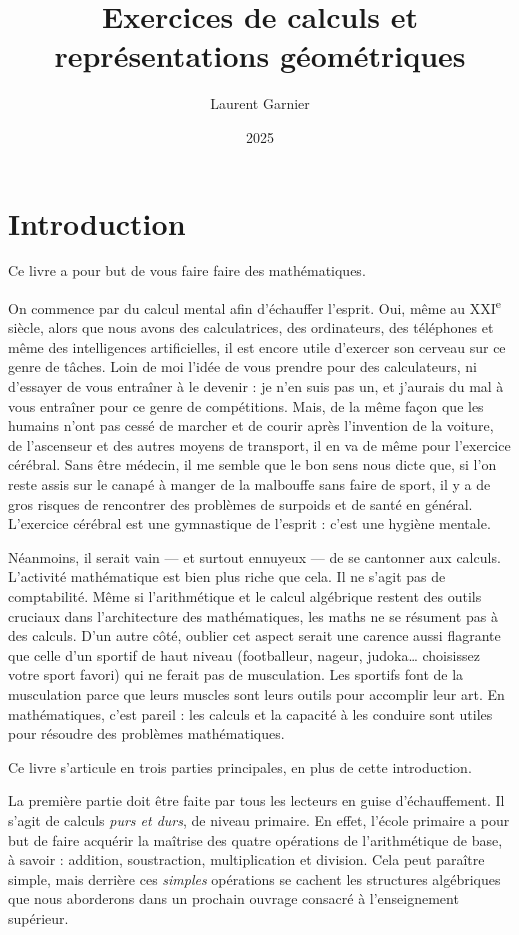 \documentclass[11pt]{article}
\author{Laurent Garnier}
\date{2025}
\title{Exercices de calculs et représentations géométriques}
\begin{document}
\maketitle




\section{Introduction}
\label{sec:org844a7ea}

Ce livre a pour but de vous faire faire des mathématiques. 

On commence par du calcul mental afin d’échauffer l’esprit. Oui, même
au XXI\textsuperscript{e} siècle, alors que nous avons des calculatrices, des
ordinateurs, des téléphones et même des intelligences artificielles,
il est encore utile d’exercer son cerveau sur ce genre de tâches. Loin
de moi l’idée de vous prendre pour des calculateurs, ni d’essayer de
vous entraîner à le devenir : je n’en suis pas un, et j’aurais du mal
à vous entraîner pour ce genre de compétitions. Mais, de la même façon
que les humains n’ont pas cessé de marcher et de courir après
l’invention de la voiture, de l’ascenseur et des autres moyens de
transport, il en va de même pour l’exercice cérébral. Sans être
médecin, il me semble que le bon sens nous dicte que, si l’on reste
assis sur le canapé à manger de la malbouffe sans faire de sport, il y
a de gros risques de rencontrer des problèmes de surpoids et de santé
en général. L’exercice cérébral est une gymnastique de l’esprit :
c’est une hygiène mentale.


Néanmoins, il serait vain — et surtout ennuyeux — de se cantonner aux
calculs. L’activité mathématique est bien plus riche que cela. Il ne
s’agit pas de comptabilité. Même si l’arithmétique et le calcul
algébrique restent des outils cruciaux dans l’architecture des
mathématiques, les maths ne se résument pas à des calculs. D’un autre
côté, oublier cet aspect serait une carence aussi flagrante que celle
d’un sportif de haut niveau (footballeur, nageur, judoka… choisissez
votre sport favori) qui ne ferait pas de musculation. Les sportifs
font de la musculation parce que leurs muscles sont leurs outils pour
accomplir leur art. En mathématiques, c’est pareil : les calculs et la
capacité à les conduire sont utiles pour résoudre des problèmes
mathématiques.


Ce livre s’articule en trois parties principales, en plus de cette
introduction.


La première partie doit être faite par tous les lecteurs en guise
d’échauffement. Il s’agit de calculs \textit{purs et durs},
de niveau primaire. En effet, l’école primaire a pour but de faire
acquérir la maîtrise des quatre opérations de l’arithmétique de base,
à savoir : addition, soustraction, multiplication et division. Cela
peut paraître simple, mais derrière ces \textit{simples}
opérations se cachent les structures algébriques que nous aborderons
dans un prochain ouvrage consacré à l’enseignement supérieur.
\end{document}
